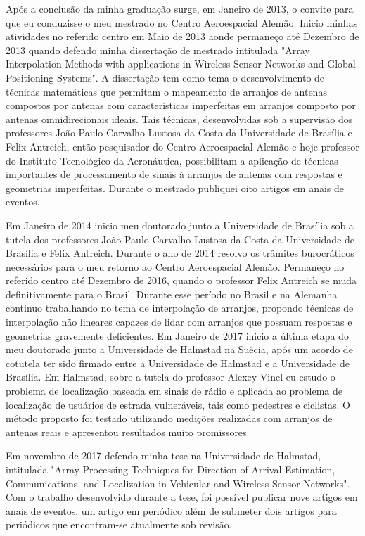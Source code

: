 \documentclass[12pt]{article}
\begin{document}
Após a conclusão da minha graduação surge, em Janeiro de 2013, o convite para que eu conduzisse o meu mestrado no Centro Aeroespacial Alemão. Inicio minhas atividades no referido centro em Maio de 2013 aonde permaneço até Dezembro de 2013 quando defendo minha dissertação de mestrado intitulada "Array Interpolation Methods with applications in Wireless Sensor Networks and Global Positioning Systems". A dissertação tem como tema o desenvolvimento de técnicas matemáticas que permitam o mapeamento de arranjos de antenas compostos por antenas com características imperfeitas em arranjos composto por antenas omnidirecionais ideais. Tais técnicas, desenvolvidas sob a supervisão dos professores João Paulo Carvalho Lustosa da Costa da Universidade de Brasília e Felix Antreich, então pesquisador do Centro Aeroespacial Alemão e hoje professor do Instituto Tecnológico da Aeronáutica, possibilitam a aplicação de técnicas importantes de processamento de sinais à arranjos de antenas com respostas e geometrias imperfeitas. Durante o mestrado publiquei oito artigos em anais de eventos.

Em Janeiro de 2014 inicio meu doutorado junto a Universidade de Brasília sob a tutela dos professores João Paulo Carvalho Lustosa da Costa da Universidade de Brasília e Felix Antreich. Durante o ano de 2014 resolvo os trâmites burocráticos necessários para o meu retorno ao Centro Aeroespacial Alemão. Permaneço no referido centro até Dezembro de 2016, quando o professor Felix Antreich se muda definitivamente para o Brasil. Durante esse período no Brasil e na Alemanha continuo trabalhando no tema de interpolação de arranjos, propondo técnicas de interpolação não lineares capazes de lidar com arranjos que possuam respostas e geometrias gravemente deficientes. Em Janeiro de 2017 inicio a última etapa do meu doutorado junto a Universidade de Halmstad na Suécia, após um acordo de cotutela ter sido firmado entre a Universidade de Halmstad e a Universidade de Brasília. Em Halmstad, sobre a tutela do professor Alexey Vinel eu estudo o problema de localização baseada em sinais de rádio e aplicada ao problema de localização de usuários de estrada vulneráveis, tais como pedestres e ciclistas. O método proposto foi testado utilizando medições realizadas com arranjos de antenas reais e apresentou resultados muito promissores.

Em novembro de 2017 defendo minha tese na Universidade de Halmstad, intitulada "Array Processing Techniques for Direction of Arrival Estimation, Communications, and Localization in Vehicular and Wireless Sensor Networks". Com o trabalho desenvolvido durante a tese, foi possível publicar nove artigos em anais de eventos, um artigo em periódico além de submeter dois artigos para periódicos que encontram-se atualmente sob revisão. 
\end{document}
